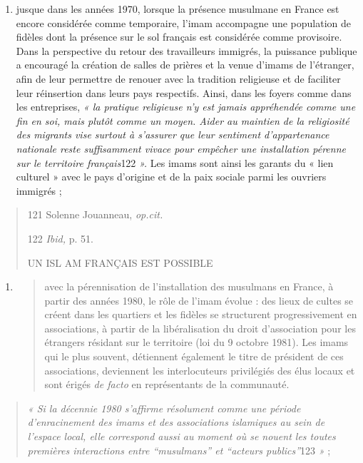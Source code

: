 \begin{enumerate}
\def\labelenumi{\arabic{enumi}.}
\item
  jusque dans les années 1970, lorsque la présence musulmane en France
  est encore considérée comme temporaire, l'imam accompagne une
  population de fidèles dont la présence sur le sol français est
  considérée comme provisoire. Dans la perspective du retour des
  travailleurs immigrés, la puissance publique a encouragé la création
  de salles de prières et la venue d'imams de l'étranger, afin de leur
  permettre de renouer avec la tradition religieuse et de faciliter leur
  réinsertion dans leurs pays respectifs. Ainsi, dans les foyers comme
  dans les entreprises, \emph{« la pratique religieuse n'y est jamais
  appréhendée comme une fin en soi, mais plutôt comme un moyen. Aider au
  maintien de la religiosité des migrants vise surtout à s'assurer que
  leur sentiment d'appartenance nationale reste suffisamment vivace pour
  empêcher une installation pérenne sur le territoire français}122
  \emph{».} Les imams sont ainsi les garants du « lien culturel » avec
  le pays d'origine et de la paix sociale parmi les ouvriers immigrés ;
\end{enumerate}

\begin{quote}
121 Solenne Jouanneau, \emph{op.cit.}

122 \emph{Ibid,} p. 51.

UN ISL AM FRANÇAIS EST POSSIBLE
\end{quote}

\begin{enumerate}
\def\labelenumi{\arabic{enumi}.}
\setcounter{enumi}{1}
\item
  \begin{quote}
  avec la pérennisation de l'installation des musulmans en France, à
  partir des années 1980, le rôle de l'imam évolue : des lieux de cultes
  se créent dans les quartiers et les fidèles se structurent
  progressivement en associations, à partir de la libéralisation du
  droit d'association pour les étrangers résidant sur le territoire (loi
  du 9 octobre 1981). Les imams qui le plus souvent, détiennent
  également le titre de président de ces associations, deviennent les
  interlocuteurs privilégiés des élus locaux et sont érigés \emph{de
  facto} en représentants de la communauté.
  \end{quote}
\end{enumerate}

\begin{quote}
\emph{« Si la décennie 1980 s'affirme résolument comme une période
d'enracinement des imams et des associations islamiques au sein de
l'espace local, elle correspond aussi au moment où se nouent les toutes
premières interactions entre ``musulmans'' et ``acteurs publics''}123
\emph{»} ;
\end{quote}

